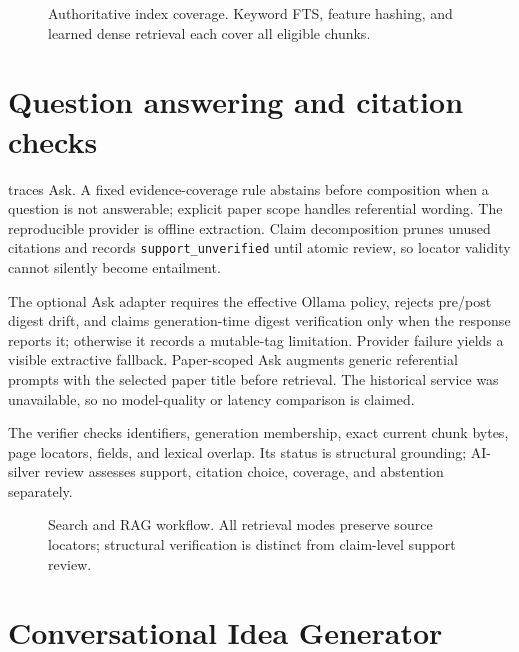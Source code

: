 \begin{figure}[htbp]
\centering

\caption[Authoritative index coverage for all retrieval representations.]{Authoritative index coverage. Keyword FTS, feature hashing, and learned dense retrieval each cover all \EligibleChunkCount{} eligible chunks.}
\label{fig:index-coverage}
\end{figure}

\section{Question answering and citation checks}

 traces Ask. A fixed evidence-coverage rule abstains before composition when a question is not answerable; explicit paper scope handles referential wording. The reproducible provider is offline extraction. Claim decomposition prunes unused citations and records \texttt{support\_unverified} until atomic review, so locator validity cannot silently become entailment.

The optional Ask adapter requires the effective Ollama policy, rejects pre/post digest drift, and claims generation-time digest verification only when the response reports it; otherwise it records a mutable-tag limitation. Provider failure yields a visible extractive fallback. Paper-scoped Ask augments generic referential prompts with the selected paper title before retrieval. The historical service was unavailable, so no model-quality or latency comparison is claimed.

The verifier checks identifiers, generation membership, exact current chunk bytes, page locators, fields, and lexical overlap. Its status is structural grounding; AI-silver review assesses support, citation choice, coverage, and abstention separately.

\begin{figure}[htbp]
\centering
\resizebox{0.99\textwidth}{!}{}
\caption[Search and RAG workflow.]{Search and RAG workflow. All retrieval modes preserve source locators; structural verification is distinct from claim-level support review.}
\label{fig:rag-workflow}
\end{figure}

\section{Conversational Idea Generator}

